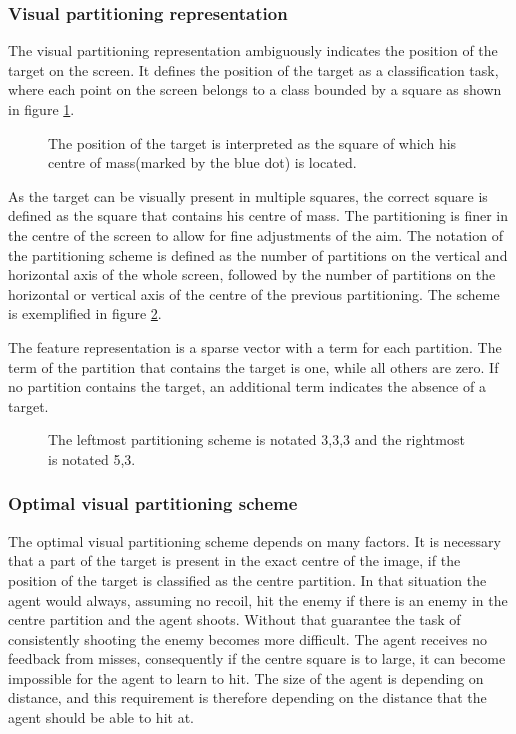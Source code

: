 \subsubsection{Visual partitioning representation}
\label{sec:vpr}
The visual partitioning representation ambiguously indicates the position of the target on the screen. It defines the position of the target as a classification task, where each point on the screen belongs to a class bounded by a square as shown in figure \ref{fig:visualpartitioning}. 
\begin{figure}[H]
    \centering
    	
    \caption[Visual partitioning representation]{The position of the target is interpreted as the square of which his centre of mass(marked by the blue dot) is located.}
    \label{fig:visualpartitioning}
\end{figure}
\noindent
As the target can be visually present in multiple squares, the correct square is defined as the square that contains his centre of mass. The partitioning is finer in the centre of the screen to allow for fine adjustments of the aim. The notation of the partitioning scheme is defined as the number of partitions on the vertical and horizontal axis of the whole screen, followed by the number of partitions on the horizontal or vertical axis of the centre of the previous partitioning. The scheme is exemplified in figure \ref{fig:visualpartitioningcompared}.

The feature representation is a sparse vector with a term for each partition. The term of the partition that contains the target is one, while all others are zero. If no partition contains the target, an additional term indicates the absence of a target.
\begin{figure}[H]
    \centering
    	
    \caption[Partitioning schemes]{The leftmost partitioning scheme is notated 3,3,3 and the rightmost is notated 5,3.}
    \label{fig:visualpartitioningcompared}
\end{figure}

\subsubsection{Optimal visual partitioning scheme}
The optimal visual partitioning scheme depends on many factors. It is necessary that a part of the target is present in the exact centre of the image, if the position of the target is classified as the centre partition. In that situation the agent would always, assuming no recoil, hit the enemy if there is an enemy in the centre partition and the agent shoots. Without that guarantee the task of consistently shooting the enemy becomes more difficult. The agent receives no feedback from misses, consequently if the centre square is to large, it can become impossible for the agent to learn to hit. The size of the agent is depending on distance, and this requirement is therefore depending on the distance that the agent should be able to hit at.

